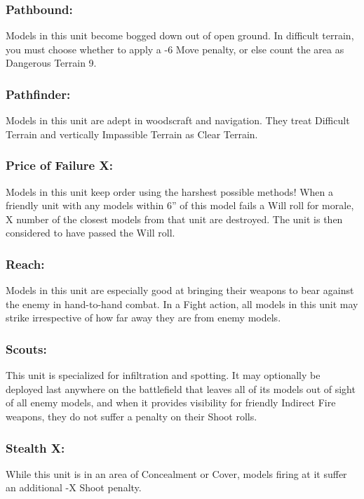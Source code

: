 \begin{multicols}{2}
\subsubsection*{Pathbound:} Models in this unit become bogged down out of open ground. In difficult terrain, you must choose whether to apply a -6 Move penalty, or else count the area as Dangerous Terrain 9.

\subsubsection*{Pathfinder:} Models in this unit are adept in woodscraft and navigation. They treat Difficult Terrain and vertically Impassible Terrain as Clear Terrain.

\subsubsection*{Price of Failure X:} Models in this unit keep order using the harshest possible methods! When a friendly unit with any models within 6'' of this model fails a Will roll for morale, X number of the closest models from that unit are destroyed. The unit is then considered to have passed the Will roll.

\subsubsection*{Reach:} Models in this unit are especially good at bringing their weapons to bear against the enemy in hand-to-hand combat. In a Fight action, all models in this unit may strike irrespective of how far away they are from enemy models.

\subsubsection*{Scouts:} This unit is specialized for infiltration and spotting. It may optionally be deployed last anywhere on the battlefield that leaves all of its models out of sight of all enemy models, and when it provides visibility for friendly Indirect Fire weapons, they do not suffer a penalty on their Shoot rolls.

\subsubsection*{Stealth X:} While this unit is in an area of Concealment or Cover, models firing at it suffer an additional -X Shoot penalty.


\end{multicols}
